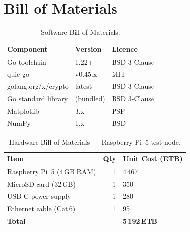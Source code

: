 \documentclass[12pt, a4paper, oneside]{report}
\begin{document}
\chapter{Bill of Materials}
\label{app:bom}

\begin{table}[H]
  \centering
  \caption{Software Bill of Materials.}
  \label{tab:bom-sw}
  \begin{tabular}{lll}
    \toprule
    \textbf{Component} & \textbf{Version} & \textbf{Licence} \\
    \midrule
    Go toolchain             & 1.22+       & BSD 3-Clause \\
    quic-go                  & v0.45.x     & MIT \\
    golang.org/x/crypto      & latest      & BSD 3-Clause \\
    Go standard library      & (bundled)   & BSD 3-Clause \\
    Matplotlib               & 3.x         & PSF \\
    NumPy                    & 1.x         & BSD \\
    \bottomrule
  \end{tabular}
\end{table}

\begin{table}[H]
  \centering
  \caption{Hardware Bill of Materials — Raspberry Pi~5 test node.}
  \label{tab:bom-hw}
  \begin{tabular}{lrl}
    \toprule
    \textbf{Item} & \textbf{Qty} & \textbf{Unit Cost (ETB)} \\
    \midrule
    Raspberry Pi~5 (4\,GB RAM) & 1 & 4\,467 \\
    MicroSD card (32\,GB)      & 1 & 350 \\
    USB-C power supply         & 1 & 280 \\
    Ethernet cable (Cat\,6)    & 1 & 95 \\
    \midrule
    \textbf{Total}             &   & \textbf{5\,192\,ETB} \\
    \bottomrule
  \end{tabular}
\end{table}
\end{document}
